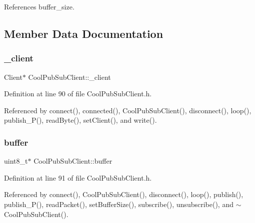 References buffer\+\_\+size.



\subsection{Member Data Documentation}
\mbox{\label{class_cool_pub_sub_client_a487a65bafb6e3b8e9ab544b13a8878a0}} 
\subsubsection{\texorpdfstring{\+\_\+client}{\_client}}
{\footnotesize\ttfamily Client$\ast$ Cool\+Pub\+Sub\+Client\+::\+\_\+client\hspace{0.3cm}{\ttfamily [private]}}



Definition at line 90 of file Cool\+Pub\+Sub\+Client.\+h.



Referenced by connect(), connected(), Cool\+Pub\+Sub\+Client(), disconnect(), loop(), publish\+\_\+\+P(), read\+Byte(), set\+Client(), and write().

\mbox{\label{class_cool_pub_sub_client_a7e8bcc6096626916046a51bebadc7851}} 
\subsubsection{\texorpdfstring{buffer}{buffer}}
{\footnotesize\ttfamily uint8\+\_\+t$\ast$ Cool\+Pub\+Sub\+Client\+::buffer\hspace{0.3cm}{\ttfamily [private]}}



Definition at line 91 of file Cool\+Pub\+Sub\+Client.\+h.



Referenced by connect(), Cool\+Pub\+Sub\+Client(), disconnect(), loop(), publish(), publish\+\_\+\+P(), read\+Packet(), set\+Buffer\+Size(), subscribe(), unsubscribe(), and $\sim$\+Cool\+Pub\+Sub\+Client().

\mbox{\label{class_cool_pub_sub_client_ae6cb10e42c057483d53516ac830ab526}} 
